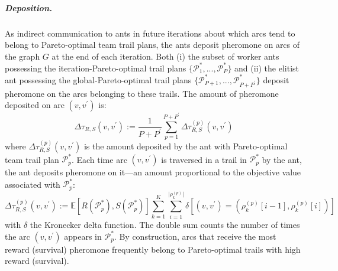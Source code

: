 \documentclass[11pt, oneside]{article}
\begin{document}
\subparagraph{Deposition.}
As indirect communication to ants in future iterations about which arcs tend to belong to Pareto-optimal team trail plans, the ants deposit pheromone on arcs of the graph $G$ at the end of each iteration.
Both (i) the subset of worker ants possessing the iteration-Pareto-optimal trail plans $\{\mathcal{P}_1^*, ..., \mathcal{P}_P^*\}$ and (ii) the elitist ant possessing the global-Pareto-optimal trail plans $\{\mathcal{P}_{P+1}^*, ..., \mathcal{P}_{P+P^\prime}^*\}$ deposit pheromone on the arcs belonging to these trails. 
The amount of pheromone deposited on arc $(v, v^\prime)$ is:
\begin{equation}
	\Delta \tau_{R,S}(v, v^\prime):=\frac{1}{P+P^\prime} \sum_{p=1}^{P+P^\prime} \Delta \tau_{R,S}^{(p)}(v, v^\prime)
\end{equation}
where $\Delta \tau_{R,S}^{(p)}(v, v^\prime)$ is the amount deposited by the ant with Pareto-optimal team trail plan $\mathcal{P}^*_p$.
Each time arc $(v, v^\prime)$ is traversed in a trail in $\mathcal{P}^*_p$ by the ant, 
the ant deposits pheromone on it---an amount proportional to the objective value associated with $\mathcal{P}^*_p$:
\begin{equation}
	\Delta \tau_{R,S}^{(p)}(v, v^\prime) := 
	\mathbb{E}[R(\mathcal{P}^*_p), S(\mathcal{P}^*_p)] 
	\sum_{k=1}^K 
	\sum_{i=1}^{\lvert \rho_k^{(p)}\rvert}
	\delta \left[ 
		(v, v^\prime)=(\rho_k^{(p)}[i-1], \rho_k^{(p)}[i])
	\right] 
\end{equation}
with $\delta$ the Kronecker delta function.
The double sum counts the number of times the arc $(v, v^\prime)$ appears in $\mathcal{P}^*_p$.
By construction, arcs that receive the most reward (survival) pheromone frequently belong to Pareto-optimal trails with high reward (survival).

\end{document}
